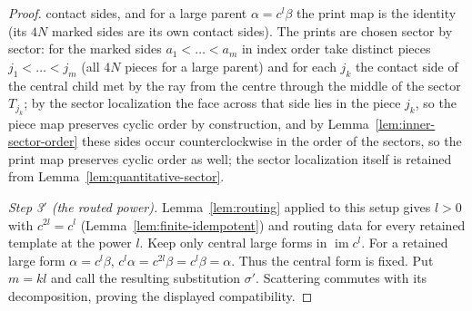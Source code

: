 \begin{proof}
contact sides, and for a large parent $\alpha=c^l\beta$ the print map is the
identity (its $4N$ marked sides are its own contact sides).  The prints
are chosen sector by sector: for the marked sides $a_1<\dots<a_m$ in index
order take distinct pieces $j_1<\dots<j_m$ (all $4N$ pieces for a large
parent) and for each $j_k$ the contact side of the central child met by the
ray from the centre through the middle of the sector $T_{j_k}$; by the
sector localization the face across that side lies in the piece $j_k$, so
the piece map preserves cyclic order by construction, and by
Lemma~\ref{lem:inner-sector-order} these sides occur counterclockwise in
the order of the sectors, so the print map preserves cyclic order as well;
the sector localization itself is retained from
Lemma~\ref{lem:quantitative-sector}.

\emph{Step 3$'$ (the routed power).}  Lemma~\ref{lem:routing} applied to this
setup gives $l>0$ with $c^{2l}=c^l$ (Lemma~\ref{lem:finite-idempotent}) and
routing data for every retained template at the power $l$.  Keep only central
large forms in $\operatorname{im}c^l$.  For a retained large form
$\alpha=c^l\beta$, $c^l\alpha=c^{2l}\beta=c^l\beta=\alpha$.  Thus the central
form is fixed.  Put $m=kl$ and call the resulting substitution $\sigma'$.
Scattering commutes with its decomposition, proving the displayed
compatibility.


\end{proof}
